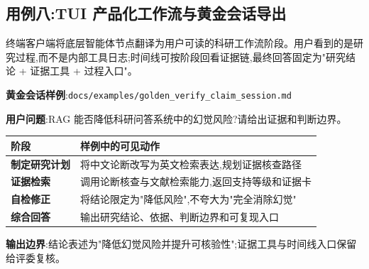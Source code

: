 \subsection{用例八:TUI 产品化工作流与黄金会话导出}
终端客户端将底层智能体节点翻译为用户可读的科研工作流阶段。用户看到的是研究过程,而不是内部工具日志;时间线可按阶段回看证据链,最终回答固定为"研究结论 + 证据工具 + 过程入口"。
\begin{plainbox}
\textbf{黄金会话样例}:\texttt{docs/examples/golden\_verify\_claim\_session.md}\par\vspace{2pt}
\textbf{用户问题}:RAG 能否降低科研问答系统中的幻觉风险?请给出证据和判断边界。\par\vspace{2pt}
\begin{tableblock}
\begin{tabularx}{0.92\textwidth}{>{\bfseries}p{28mm}X}
\toprule
阶段 & 样例中的可见动作 \\
\midrule
制定研究计划 & 将中文论断改写为英文检索表达,规划证据核查路径 \\
证据检索 & 调用论断核查与文献检索能力,返回支持等级和证据卡 \\
自检修正 & 将结论限定为"降低风险",不夸大为"完全消除幻觉" \\
综合回答 & 输出研究结论、依据、判断边界和可复现入口 \\
\bottomrule
\end{tabularx}
\end{tableblock}
\textbf{输出边界}:结论表述为"降低幻觉风险并提升可核验性";证据工具与时间线入口保留给评委复核。
\end{plainbox}

